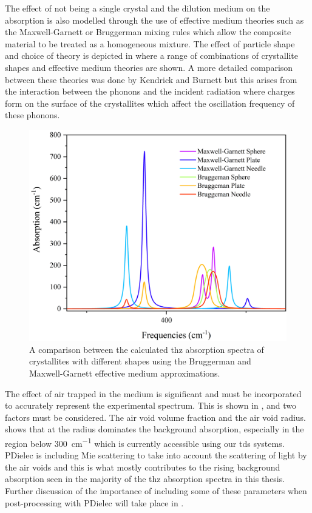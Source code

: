 The effect of not being a single crystal and the dilution medium on the absorption is also modelled through the use of effective medium theories such as the Maxwell\nobreakdash-Garnett or Bruggerman mixing rules which allow the composite material to be treated as a homogeneous mixture. The effect of particle shape and choice of theory is depicted in  where a range of combinations of crystallite shapes and effective medium theories are shown. A more detailed comparison between these theories was done by Kendrick and Burnett \cite{Kendrick2020} but this arises from the interaction between the phonons and the incident radiation where charges form on the surface of the crystallites which affect the oscillation frequency of these phonons. 

\begin{figure}
    \centering
    \includegraphics[scale=0.6]{Figures/Misc/Theory/ZnOMRG.png}
    \captionsetup{font = footnotesize, justification = centering}
    \caption[A Comparison between Crystallites of Different Shapes using the Bruggerman and Maxwell-Garnett Effective Medium Approximations]{A comparison between the calculated \acrshort{thz} absorption spectra of crystallites with different shapes using the Bruggerman and Maxwell-Garnett effective medium approximations.}
    \label{fig:EMAsShapes}
\end{figure}

The effect of air trapped in the medium is significant and must be incorporated to accurately represent the experimental spectrum. This is shown in , and two factors must be considered. The air void volume fraction and the air void radius.  shows that at the radius dominates the background absorption, especially in the region below \SI{300}{cm^{-1}} which is currently accessible using our \acrshort{tds} systems. PDielec is including Mie scattering to take into account the scattering of light by the air voids and this is what mostly contributes to the rising background absorption seen in the majority of the \acrshort{thz} absorption spectra in this thesis. Further discussion of the importance of including some of these parameters when post\nobreakdash-processing with PDielec will take place in .

